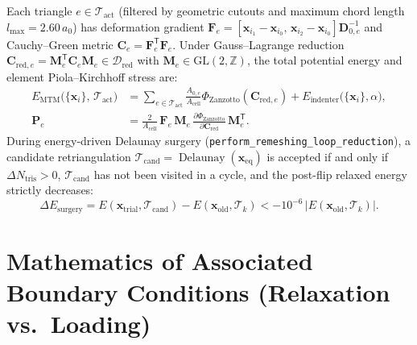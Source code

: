 \documentclass[11pt,a4paper]{article}
\newcommand{\Z}{\mathbb{Z}}
\newcommand{\T}{^{\mathsf T}}
\newcommand{\code}[1]{\texttt{#1}}
\begin{document}
Each triangle $e \in \mathcal{T}_{\text{act}}$ (filtered by geometric cutouts and maximum chord length $l_{\max} = 2.60\,a_0$) has deformation gradient $\mathbf{F}_e = [\mathbf{x}_{i_1}-\mathbf{x}_{i_0},\, \mathbf{x}_{i_2}-\mathbf{x}_{i_0}]\mathbf{D}_{0,e}^{-1}$ and Cauchy--Green metric $\mathbf{C}_e = \mathbf{F}_e\T\mathbf{F}_e$. Under Gauss--Lagrange reduction $\mathbf{C}_{\text{red},e} = \mathbf{M}_e\T \mathbf{C}_e \mathbf{M}_e \in \mathcal{D}_{\text{red}}$ with $\mathbf{M}_e \in \mathrm{GL}(2,\Z)$, the total potential energy and element Piola--Kirchhoff stress are:
\begin{align}
  E_{\text{MTM}}\big(\{\mathbf{x}_i\},\, \mathcal{T}_{\text{act}}\big) &= \sum_{e \in \mathcal{T}_{\text{act}}} \frac{A_{0,e}}{A_{\text{cell}}} \Phi_{\text{Zanzotto}}(\mathbf{C}_{\text{red},e}) + E_{\text{indenter}}\big(\{\mathbf{x}_i\}, \alpha\big), \\
  \mathbf{P}_e &= \frac{2}{A_{\text{cell}}}\,\mathbf{F}_e\,\mathbf{M}_e\,\frac{\partial \Phi_{\text{Zanzotto}}}{\partial \mathbf{C}_{\text{red}}}\,\mathbf{M}_e\T.
\end{align}
During energy-driven Delaunay surgery (\code{perform\_remeshing\_loop\_reduction}), a candidate retriangulation $\mathcal{T}_{\text{cand}} = \operatorname{Delaunay}(\mathbf{x}_{\text{eq}})$ is accepted if and only if $\Delta N_{\text{tris}} > 0$, $\mathcal{T}_{\text{cand}}$ has not been visited in a cycle, and the post-flip relaxed energy strictly decreases:
\begin{equation}
  \Delta E_{\text{surgery}} = E(\mathbf{x}_{\text{trial}}, \mathcal{T}_{\text{cand}}) - E(\mathbf{x}_{\text{old}}, \mathcal{T}_k) < -10^{-6}\,|E(\mathbf{x}_{\text{old}}, \mathcal{T}_k)|.
\end{equation}

\section{Mathematics of Associated Boundary Conditions (Relaxation vs.\ Loading)}
\end{document}
